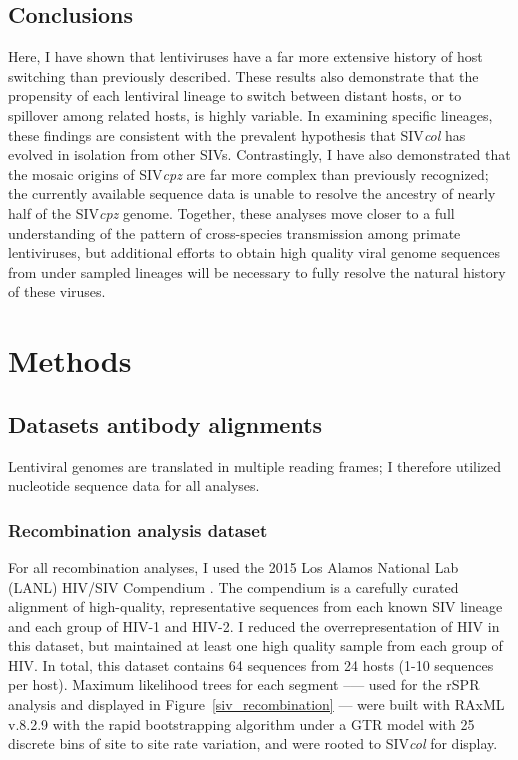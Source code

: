\subsection{Conclusions}
Here, I have shown that lentiviruses have a far more extensive history of host switching than previously described.
These results also demonstrate that the propensity of each lentiviral lineage to switch between distant hosts, or to spillover among related hosts, is highly variable.
In examining specific lineages, these findings are consistent with the prevalent hypothesis that SIV\textit{col} has evolved in isolation from other SIVs.
Contrastingly, I have also demonstrated that the mosaic origins of SIV\textit{cpz} are far more complex than previously recognized; the currently available sequence data is unable to resolve the ancestry of nearly half of the SIV\textit{cpz} genome.
Together, these analyses move closer to a full understanding of the pattern of cross-species transmission among primate lentiviruses, but additional efforts to obtain high quality viral genome sequences from under sampled lineages will be necessary to fully resolve the natural history of these viruses.

\clearpage
\section{Methods}
\subsection*{Datasets antibody alignments}
Lentiviral genomes are translated in multiple reading frames; I therefore utilized nucleotide sequence data for all analyses.

\subsubsection*{Recombination analysis dataset}
For all recombination analyses, I used the 2015 Los Alamos National Lab (LANL) HIV/SIV Compendium \citep{los2012hiv}.
The compendium is a carefully curated alignment of high-quality, representative sequences from each known SIV lineage and each group of HIV-1 and HIV-2.
I reduced the overrepresentation of HIV in this dataset, but maintained at least one high quality sample from each group of HIV.
In total, this dataset contains 64 sequences from 24 hosts (1-10 sequences per host).
Maximum likelihood trees for each segment --— used for the rSPR analysis and displayed in Figure~\ref{siv_recombination} --- were built with RAxML v.8.2.9 \citep{stamatakis2014raxml} with the rapid bootstrapping algorithm under a GTR model with 25 discrete bins of site to site rate variation, and were rooted to SIV\textit{col} for display.

